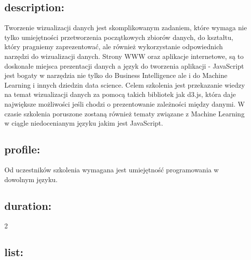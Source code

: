 \documentclass{article}[10pt]
\begin{document}
	\subsection*{description:}
	\begin{adjustwidth}{2cm}{}
		Tworzenie wizualizacji danych jest skomplikowanym zadaniem, które wymaga nie tylko umiejętności przetworzenia początkowych zbiorów danych, do kształtu, który pragniemy zaprezentować, ale również wykorzystanie odpowiednich narzędzi do wizualizacji danych.
Strony WWW oraz aplikacje internetowe, są to doskonałe miejsca prezentacji danych a język do tworzenia aplikacji - JavaScript jest bogaty w narzędzia nie tylko do Business Intelligence ale i do Machine Learning i innych dziedzin data science.
Celem szkolenia jest przekazanie wiedzy na temat wizualizacji danych za pomocą takich bibliotek jak d3.js, która daje największe możliwości jeśli chodzi o prezentowanie zależności między danymi. W czasie szkolenia poruszone zostaną również tematy związane z Machine Learning w ciągle niedocenianym języku jakim jest JavaScript.


	\end{adjustwidth}
	\subsection*{profile:}
\begin{adjustwidth}{2cm}{}
	
Od uczestników szkolenia wymagana jest umiejętność programowania w dowolnym języku.

\end{adjustwidth}
	\subsection*{duration:}
\begin{adjustwidth}{2cm}{}
	2
\end{adjustwidth}

	\subsection*{list:}
\begin{adjustwidth}{1.5cm}{}
	\begin{itemize}







	\end{itemize}
\end{adjustwidth}
\end{document}
